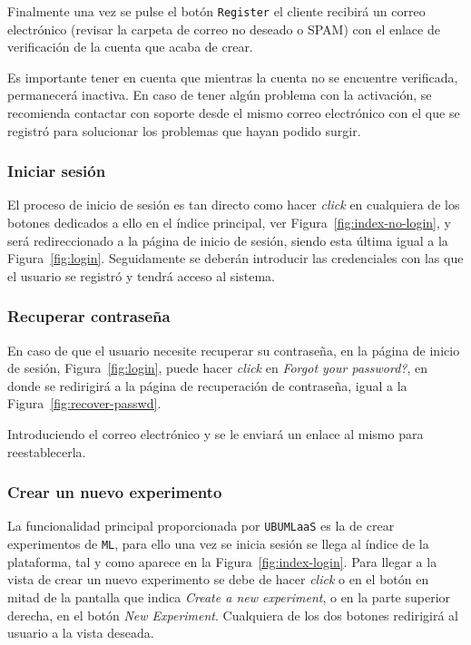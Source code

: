Finalmente una vez se pulse el botón \texttt{Register} el cliente recibirá un correo electrónico (revisar la carpeta de correo no deseado o SPAM) con el enlace de verificación de la cuenta que acaba de crear.

Es importante tener en cuenta que mientras la cuenta no se encuentre verificada, permanecerá inactiva. En caso de tener algún problema con la activación, se recomienda contactar con soporte desde el mismo correo electrónico con el que se registró para solucionar los problemas que hayan podido surgir.

\subsubsection{Iniciar sesión}
El proceso de inicio de sesión es tan directo como hacer \textit{click} en cualquiera de los botones dedicados a ello en el índice principal, ver Figura~\ref{fig:index-no-login}, y será redireccionado a la página de inicio de sesión, siendo esta última igual a la Figura~\ref{fig:login}. Seguidamente se deberán introducir las credenciales con las que el usuario se registró y tendrá acceso al sistema.


\subsubsection{Recuperar contraseña}
En caso de que el usuario necesite recuperar su contraseña, en la página de inicio de sesión, Figura~\ref{fig:login}, puede hacer \textit{click} en \textit{Forgot your password?}, en donde se redirigirá a la página de recuperación de contraseña, igual a la Figura~\ref{fig:recover-passwd}. 

Introduciendo el correo electrónico y se le enviará un enlace al mismo para reestablecerla.


\subsubsection{Crear un nuevo experimento}
La funcionalidad principal proporcionada por \texttt{UBUMLaaS} es la de crear experimentos de \texttt{ML}, para ello una vez se inicia sesión se llega al índice de la plataforma, tal y como aparece en la Figura~\ref{fig:index-login}. Para llegar a la vista de crear un nuevo experimento se debe de hacer \textit{click} o en el botón en mitad de la pantalla que indica \textit{Create a new experiment}, o en la parte superior derecha, en el botón \textit{New Experiment}. Cualquiera de los dos botones redirigirá al usuario a la vista deseada.

